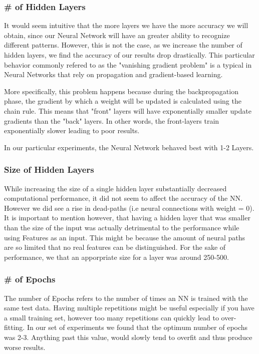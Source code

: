 \documentclass[11pt,onecolumn]{article} %
\begin{document}
\subsubsection{\# of Hidden Layers}
It would seem intuitive that the more layers we have the more accuracy we will obtain, since our Neural Network will have an greater ability to recognize different patterns. However, this is not the case, as we increase the number of hidden layers, we find the accuracy of our results drop drastically. This particular behavior commonly refered to as the "vanishing gradient problem" is a typical in Neural Networks that rely on propagation and gradient-based learning.
\par More specifically, this problem happens because during the backpropagation phase, the gradient by which a weight will be updated is calculated using the chain rule. This means that "front" layers will have exponentially smaller update gradients than the "back" layers. In other words, the front-layers train exponentially slower leading to poor results.
\par In our particular experiments, the Neural Network behaved best with 1-2 Layers.

\subsubsection{Size of Hidden Layers}
While increasing the size of a single hidden layer substantially decreased computational performance, it did not seem to affect the accuracy of the NN. However we did see a rise in dead-paths (i.e neural connections with weight = 0). It is important to mention however, that having a hidden layer that was smaller than the size of the input was actually detrimental to the performance while using Features as an input. This might be because the amount of neural paths are so limited that no real features can be distinguished. For the sake of performance, we that an apporpriate size for a layer was around 250-500.

\subsubsection{\# of Epochs}
The number of Epochs refers to the number of times an NN is trained with the same test data. Having multiple repetitions might be useful especially if you have a small training set, however too many repetitions can quickly lead to over-fitting. In our set of experiments we found that the optimum number of epochs was 2-3. Anything past this value, would slowly tend to overfit and thus produce worse results.
\end{document}
